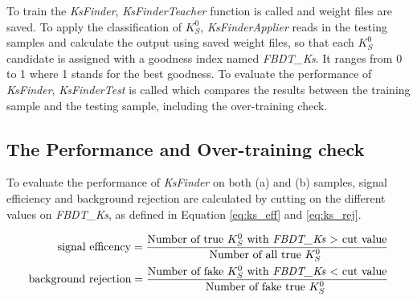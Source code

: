 To train the \textit{KsFinder}, \textit{KsFinderTeacher} function is called and weight files are saved. To apply the classification of $K_S^0$, \textit{KsFinderApplier} reads in the testing samples and calculate the output using saved weight files, so that each $K_S^0$ candidate is assigned with a goodness index named \textit{FBDT\_Ks}. It ranges from 0 to 1 where 1 stands for the best goodness. To evaluate the performance of \textit{KsFinder}, \textit{KsFinderTest} is called which compares the results between the training sample and the testing sample, including the over-training check. 

\subsection{The Performance and Over-training check}
To evaluate the performance of \textit{KsFinder} on both (a) and (b) samples, signal efficiency and background rejection are calculated by cutting on the different values on \textit{FBDT\_Ks}, as defined in Equation \ref{eq:ks_eff} and \ref{eq:ks_rej}. 

\begin{comment}
\begin{table}
\small
\begin{tabular}{c|c|c|c} 
\hline
Cuts &  Efficiency & purity & BKG rejection\\
\hline
Belle(default): nb\_vlike $>0.5$ \& nb\_nolam $> -0.4$ & 90\% & 95\% & 95\% \\
Belle(optimized): nb\_vlike $>$ 0.2 & 93\% & 95\% & 94\% \\
Belle II extra cut:cosVe $>$ 0.9 & 96\% & 82\% & 80\% \\
Belle II extra cut:cosVe$>$ 0.9 \& signi $>10$ & 94\% & 88\% & 87\% \\
\textcolor{red}{Belle II extra cut: FBDT\_Ks $>$ 0.74} & \textcolor{red}{95\%} & \textcolor{red}{97\%}  & \textcolor{red}{97\%} \\
\hline
\end{tabular}
\caption{\tiny Summarized performance on $K_S^0$ reconstruction. (The higher is better.)}
\end{table}
\end{comment}




\begin{eqnarray}
	\text{signal efficency} = \frac{\text{Number of true $K_S^0$ with \textit{FBDT\_Ks} $>$ cut value}}{\text{Number of all true $K_S^0$ }} \label{eq:ks_eff}\\
	\text{background rejection} = \frac{\text{Number of fake $K_S^0$ with  \textit{FBDT\_Ks} $<$ cut value}}{\text{Number of fake true $K_S^0$ }} \label{eq:ks_rej}
\end{eqnarray}

